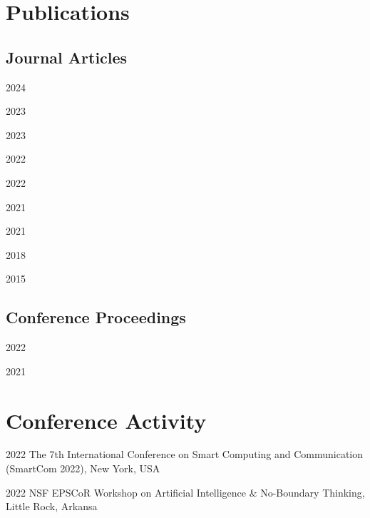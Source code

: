 \documentclass[12pt,letterpaper]{report}
\begin{document}
    \section*{Publications}
    \subsection*{Journal Articles}
    \begin{tablist}
        \item[2024] \tab{}
        \item[2023] \tab{}
        \item[2023] \tab{}
        \item[2022] \tab{}
        \item[2022] \tab{} 
        \item[2021] \tab{}
        \item[2021] \tab{}
        \item[2018] \tab{}
        \item[2015] \tab{}
    \end{tablist}

    \subsection*{Conference Proceedings}
    \begin{tablist}
        \item[2022] \tab{}
        \item[2021] \tab{}
    \end{tablist}


    \section*{Conference Activity}
    \begin{tablist}
        \item[2022] \tab{}The 7th International Conference on Smart Computing and Communication (SmartCom 2022), New York, USA
        \item[2022] \tab{}NSF EPSCoR Workshop on Artificial Intelligence \& No-Boundary Thinking, Little Rock, Arkansa
    \end{tablist}
\end{document}
